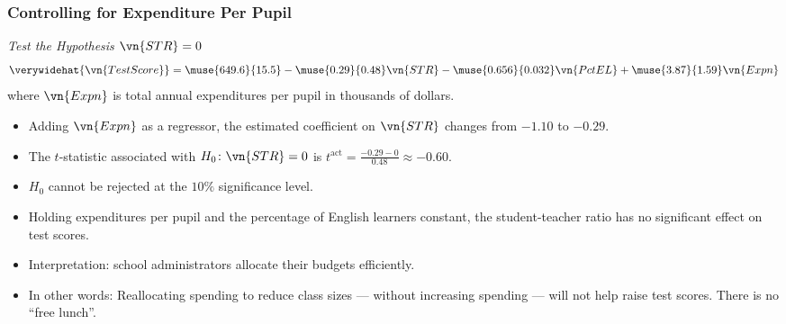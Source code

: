 \begin{frame}
\frametitle{Controlling for Expenditure Per Pupil}
\emph{Test the Hypothesis $\vn{STR}=0$}
\begin{align*}
\verywidehat{\vn{TestScore}}
  = \muse{649.6}{15.5} - \muse{0.29}{0.48}   \vn{STR}
                       - \muse{0.656}{0.032} \vn{PctEL}
                       + \muse{3.87}{1.59}   \vn{Expn}
\end{align*}
where $\vn{Expn}$ is total annual expenditures per pupil in thousands of dollars.
\begin{itemize}
\item Adding $\vn{Expn}$ as a regressor, the estimated coefficient on $\vn{STR}$ changes from $-1.10$ to $-0.29$. 
\item The $t$-statistic associated with $H_{0}\colon \vn{STR}=0$ is $t^{\text{act}}=\frac{-0.29-0}{0.48}\approx-0.60$. \item $H_{0}$ cannot be rejected at the $10\%$ significance level.
\item Holding expenditures per pupil and the percentage of English learners constant, the student-teacher ratio has no significant effect on test scores. 
\item Interpretation: school administrators allocate their budgets efficiently.
\item In other words: Reallocating spending to reduce class sizes --- without increasing spending --- will not help raise test scores. There is no ``free lunch''. 
\end{itemize}
\end{frame}

